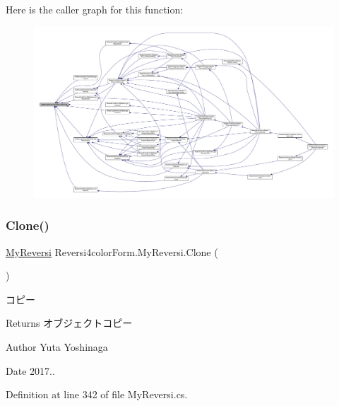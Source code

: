 Here is the caller graph for this function\+:\nopagebreak
\begin{figure}[H]
\begin{center}
\leavevmode
\includegraphics[width=350pt]{class_reversi4color_form_1_1_my_reversi_a02c145ac89302f2360cdb0c0391a38ce_icgraph}
\end{center}
\end{figure}
\mbox{\label{class_reversi4color_form_1_1_my_reversi_a45ce9de1a7d3209c2ad6c256ad1c4fe8}} 
\subsubsection{\texorpdfstring{Clone()}{Clone()}}
{\footnotesize\ttfamily \hyperlink{class_reversi4color_form_1_1_my_reversi}{My\+Reversi} Reversi4color\+Form.\+My\+Reversi.\+Clone (\begin{DoxyParamCaption}{ }\end{DoxyParamCaption})}



コピー 

\begin{DoxyReturn}{Returns}
オブジェクトコピー 
\end{DoxyReturn}
\begin{DoxyAuthor}{Author}
Yuta Yoshinaga 
\end{DoxyAuthor}
\begin{DoxyDate}{Date}
2017.. 
\end{DoxyDate}


Definition at line 342 of file My\+Reversi.\+cs.

